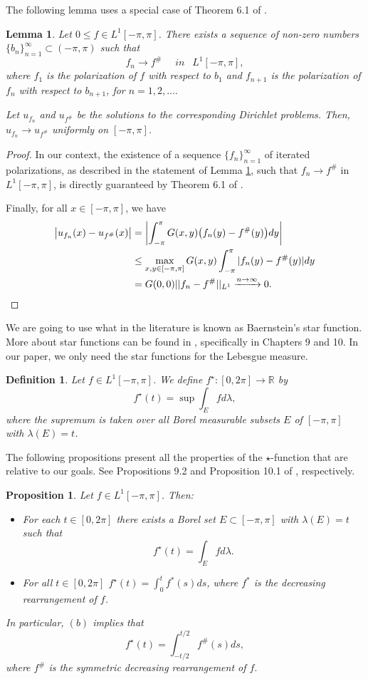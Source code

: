 \documentclass[11pt]{amsart}
\newtheorem{proposition}[theorem]{Proposition}
\newtheorem{lemma}[theorem]{Lemma}
\newtheorem{definition}[theorem]{Definition}
\numberwithin{equation}{section}
\begin{document}
The following lemma uses a special case of Theorem 6.1 of \cite{Brock}.
\begin{lemma}\label{seq of polar to sdr}
Let \(0\leq f\in L^1[-\pi,\pi]\). There exists a sequence of non-zero numbers \(\{b_n\}_{n=1}^\infty\subset(-\pi,\pi)\) such that
\[f_n\longrightarrow f^\#\quad\textit{ in }\:\:L^1[-\pi,\pi],\]
where \(f_1\) is the polarization of \(f\) with respect to \(b_1\) and \(f_{n+1}\) is the polarization of \(f_n\) with respect to \(b_{n+1}\), for \(n=1,2,\dots.\)
\par Let \(u_{f_{n}}\) and \(u_{f^\#}\) be the solutions to the corresponding Dirichlet problems. Then, \(u_{f_{n}}\longrightarrow u_{f^\#}\) uniformly on \([-\pi,\pi]\).
\end{lemma}
\begin{proof}
In our context, the existence of a sequence \(\{f_n\}_{n=1}^\infty\) of iterated polarizations, as described in the statement of Lemma \ref{seq of polar to sdr}, such that \(f_n\longrightarrow f^\#\) in \(L^1[-\pi,\pi]\), is directly guaranteed by Theorem 6.1 of \cite{Brock}.
\par Finally, for all \(x\in[-\pi,\pi]\), we have
\begin{align*}
\bigl|u_{f_{n}}(x)-u_{f^\#}(x)\bigr|&=\left|\int_{-\pi}^\pi G(x,y)\bigl(f_n(y)-f^\#(y)\bigr)dy\right|\\
&\leq \max_{x,y\in[-\pi,\pi]}G(x,y)\int_{-\pi}^\pi |f_n(y)-f^\#(y)|dy\\
&=G(0,0)||f_n-f^\#||_{L^1}\xrightarrow{n\to\infty}0. \qedhere
\end{align*}
\end{proof}
We are going to use what in the literature is known as Baernstein's star function. More about star functions can be found in \cite{Baernstein}, specifically in Chapters 9 and 10. In our paper, we only need the star functions for the Lebesgue measure.
\begin{definition}\textnormal{
Let \(f\in L^1[-\pi,\pi]\). We define \(f^\star:[0,2\pi]\to\mathbb{R}\) by
\[f^\star(t)=\sup\int_E f d\lambda,\]
where the supremum is taken over all Borel measurable subsets \(E\) of \([-\pi,\pi]\) with \(\lambda(E)=t\).}
\end{definition}
The following propositions present all the properties of the \(\star\)-function that are relative to our goals. See Propositions 9.2 and Proposition 10.1 of \cite{Baernstein}, respectively.
\begin{proposition}\label{properties of star}
Let \(f\in L^1[-\pi,\pi]\). Then:
\begin{itemize}
    \item[(a)] For each \(t\in[0,2\pi]\) there exists a Borel set \(E\subset[-\pi,\pi]\) with \(\lambda(E)=t\) such that 
    \[f^\star(t)=\int_E fd\lambda.\]
    \item[(b)] For all \(t\in[0,2\pi]\) \(f^\star(t)=\displaystyle\int_0^tf^\ast(s)ds\), where \(f^*\) is the decreasing rearrangement of \(f\).
\end{itemize}
In particular, \((b)\) implies that
\[f^\star(t)=\int_{-t/2}^{t/2}f^\#(s)ds,\]
where \(f^\#\) is the symmetric decreasing rearrangement of \(f.\)
\end{proposition}
\end{document}
